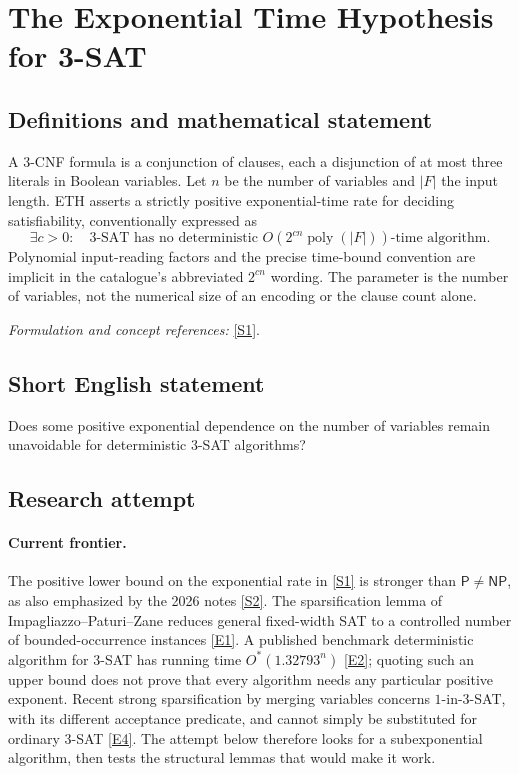 \documentclass[11pt,a4paper]{article}
\newcommand{\sref}[2]{\hyperlink{source:#1:#2}{[S#2]}}
\newcommand{\eref}[2]{\hyperlink{extra:#1:#2}{[E#2]}}
\newif\ifshowcatalogue
\newcommand{\cataloguescope}[1]{\ifshowcatalogue
 \paragraph{Exact scope in the supplied catalogue.}
 \begin{quote}\small #1\end{quote}\fi}
\numberwithin{equation}{section}
\begin{document}
\setcounter{section}{0}
\clearpage
\section*{\texorpdfstring{The Exponential Time Hypothesis for 3-SAT}{The Exponential Time Hypothesis for 3-SAT}}\label{30006694}
\subsection{Definitions and mathematical statement}
A $3$-CNF formula is a conjunction of clauses, each a disjunction of at most three literals in Boolean variables. Let $n$ be the number of variables and $|F|$ the input length. ETH asserts a strictly positive exponential-time rate for deciding satisfiability, conventionally expressed as
\[
 \exists c>0:\quad 3\text{-SAT has no deterministic }O(2^{cn}\operatorname{poly}(|F|))\text{-time algorithm}.
\]
Polynomial input-reading factors and the precise time-bound convention are implicit in the catalogue's abbreviated $2^{cn}$ wording. The parameter is the number of variables, not the numerical size of an encoding or the clause count alone.
\par\smallskip\textit{Formulation and concept references:} \sref{30006694}{1}.
\cataloguescope{Prove or disprove the Exponential Time Hypothesis: there exists a constant c > 0 such that 3-SAT cannot be solved in deterministic time 2\textasciicircum{}\{c n\}.}
\subsection{Short English statement}
Does some positive exponential dependence on the number of variables remain unavoidable for deterministic $3$-SAT algorithms?
\subsection{Research attempt}
\paragraph{Current frontier.}
The positive lower bound on the exponential rate in \sref{30006694}{1} is
stronger than $\mathsf P\ne\mathsf{NP}$, as also emphasized by the
2026 notes \sref{30006694}{2}. The sparsification lemma of
Impagliazzo--Paturi--Zane reduces general fixed-width SAT to a controlled
number of bounded-occurrence instances \eref{30006694}{1}. A published
benchmark deterministic algorithm for $3$-SAT has running time
$O^*(1.32793^n)$ \eref{30006694}{2}; quoting such an upper bound does not prove
that every algorithm needs any particular positive exponent. Recent
strong sparsification by merging variables concerns $1$-in-$3$-SAT,
with its different acceptance predicate, and cannot simply be substituted
for ordinary $3$-SAT \eref{30006694}{4}. The attempt below therefore looks
for a subexponential algorithm, then tests the structural lemmas that
would make it work.
\end{document}

